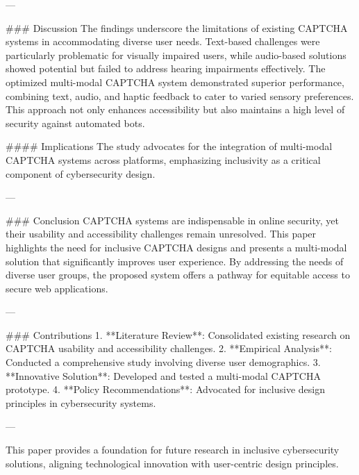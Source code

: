 ---

### Discussion  
The findings underscore the limitations of existing CAPTCHA systems in accommodating diverse user needs. Text-based challenges were particularly problematic for visually impaired users, while audio-based solutions showed potential but failed to address hearing impairments effectively. The optimized multi-modal CAPTCHA system demonstrated superior performance, combining text, audio, and haptic feedback to cater to varied sensory preferences. This approach not only enhances accessibility but also maintains a high level of security against automated bots.

#### Implications  
The study advocates for the integration of multi-modal CAPTCHA systems across platforms, emphasizing inclusivity as a critical component of cybersecurity design.

---

### Conclusion  
CAPTCHA systems are indispensable in online security, yet their usability and accessibility challenges remain unresolved. This paper highlights the need for inclusive CAPTCHA designs and presents a multi-modal solution that significantly improves user experience. By addressing the needs of diverse user groups, the proposed system offers a pathway for equitable access to secure web applications.

---

### Contributions  
1. **Literature Review**: Consolidated existing research on CAPTCHA usability and accessibility challenges.  
2. **Empirical Analysis**: Conducted a comprehensive study involving diverse user demographics.  
3. **Innovative Solution**: Developed and tested a multi-modal CAPTCHA prototype.  
4. **Policy Recommendations**: Advocated for inclusive design principles in cybersecurity systems.

---

This paper provides a foundation for future research in inclusive cybersecurity solutions, aligning technological innovation with user-centric design principles.